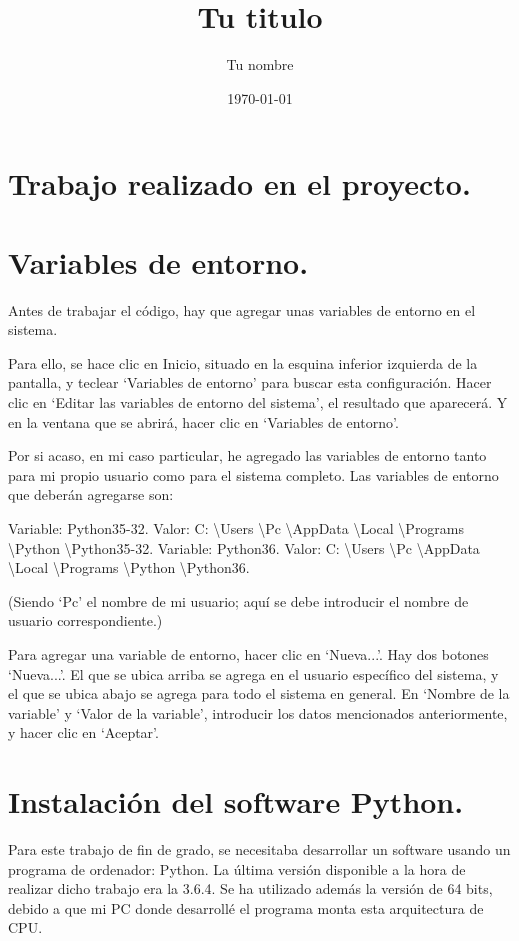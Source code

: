 \documentclass[12pt]{article}
\title{Tu titulo}					%
\author{Tu nombre}					%
\date{\today}						%
\begin{document}
\tableofcontents
\pagebreak


\section{Trabajo realizado en el proyecto.}

\section{Variables de entorno.}

Antes de trabajar el código, hay que agregar unas variables de entorno en el sistema.

Para ello, se hace clic en Inicio, situado en la esquina inferior izquierda de la pantalla, y teclear ‘Variables de entorno’ para buscar esta configuración. Hacer clic en ‘Editar las variables de entorno del sistema’, el resultado que aparecerá. Y en la ventana que se abrirá, hacer clic en ‘Variables de entorno’.

Por si acaso, en mi caso particular, he agregado las variables de entorno tanto para mi propio usuario como para el sistema completo. Las variables de entorno que deberán agregarse son:

Variable: Python35-32. Valor: C: \textbackslash Users \textbackslash Pc \textbackslash AppData \textbackslash Local \textbackslash Programs \textbackslash Python \textbackslash Python35-32.
Variable: Python36. Valor: C: \textbackslash Users \textbackslash Pc \textbackslash AppData \textbackslash Local \textbackslash Programs \textbackslash Python \textbackslash Python36.

(Siendo ‘Pc’ el nombre de mi usuario; aquí se debe introducir el nombre de usuario correspondiente.)

Para agregar una variable de entorno, hacer clic en ‘Nueva...’. Hay dos botones ‘Nueva...’. El que se ubica arriba se agrega en el usuario específico del sistema, y el que se ubica abajo se agrega para todo el sistema en general. En ‘Nombre de la variable’ y ‘Valor de la variable’, introducir los datos mencionados anteriormente, y hacer clic en ‘Aceptar’.

\section{Instalación del software Python.}

Para este trabajo de fin de grado, se necesitaba desarrollar un software usando un programa de ordenador: Python. La última versión disponible a la hora de realizar dicho trabajo era la 3.6.4. Se ha utilizado además la versión de 64 bits, debido a que mi PC donde desarrollé el programa monta esta arquitectura de CPU.
\end{document}
